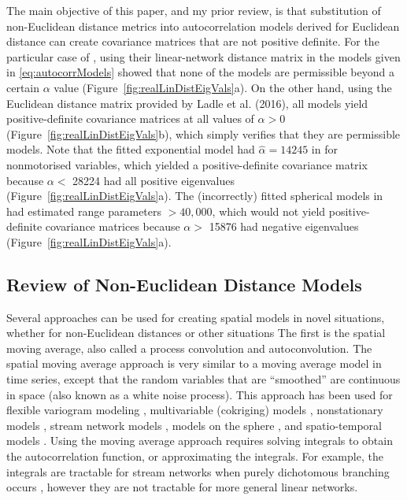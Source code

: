 The main objective of this paper, and my prior review, is that substitution of non-Euclidean distance metrics into autocorrelation models derived for Euclidean distance can create covariance matrices that are not positive definite. For the particular case of \citet{Ladl:Avga:Whea:Boyc:pred:2016}, using their linear-network distance matrix in the models given in \ref{eq:autocorrModels} showed that none of the models are permissible beyond a certain $\alpha$ value (Figure~\ref{fig:realLinDistEigVals}a).  On the other hand, using the Euclidean distance matrix provided by Ladle et al. (2016), all models yield positive-definite covariance matrices at all values of $\alpha > 0$ (Figure~\ref{fig:realLinDistEigVals}b), which simply verifies that they are permissible models.  Note that the fitted exponential model had $\hat{\alpha} = 14245$ in \citet{Ladl:Avga:Whea:Boyc:pred:2016} for nonmotorised variables, which yielded a positive-definite covariance matrix because $\alpha <$ 28224 had all positive eigenvalues (Figure~\ref{fig:realLinDistEigVals}a). The (incorrectly) fitted spherical models in \citet{Ladl:Avga:Whea:Boyc:pred:2016} had estimated range parameters $>40,000$, which would not yield positive-definite covariance matrices because $\alpha >$ 15876 had negative eigenvalues (Figure~\ref{fig:realLinDistEigVals}a).

\subsection*{Review of Non-Euclidean Distance Models}

Several approaches can be used for creating spatial models in novel situations, whether for non-Euclidean distances or other situations  The first is the spatial moving average, also called a process convolution and autoconvolution.  The spatial moving average approach is very similar to a moving average model in time series, except that the random variables that are ``smoothed'' are continuous in space (also known as a white noise process).  This approach has been used for flexible variogram modeling \citep{Barr:Ver:blac:1996}, multivariable (cokriging) models \citep{Ver:Barr:cons:1998,Ver:Cres:Barr:flex:2004}, nonstationary models \citep{Higd:proc:1998,Higd:Swal:Kern:non-:1999}, stream network models \citep{Ver:Pete:Theo:spat:2006, Cres:Frey:Harc:Smit:spat:2006, Ver:Pete:Move:2010}, models on the sphere \citep{Gnei:stri:2013}, and spatio-temporal models \citep{Wikl:kern:2002,Conn:John:Ver:spat:2015}. Using the moving average approach requires solving integrals to obtain the autocorrelation function, or approximating the integrals. For example, the integrals are tractable for stream networks when purely dichotomous branching occurs \citep{Ver:Pete:Theo:spat:2006}, however they are not tractable for more general linear networks. 

